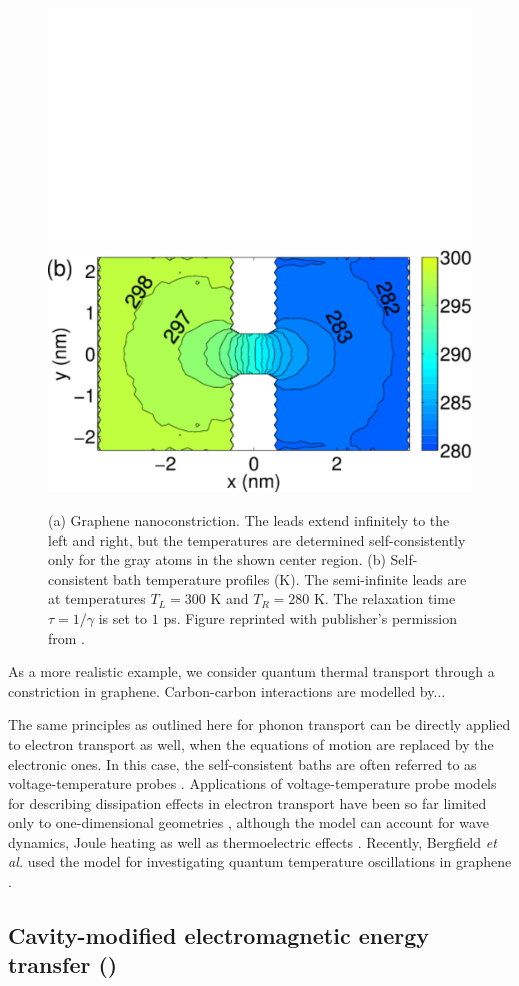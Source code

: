 \begin{figure}
 \begin{center}
 \includegraphics[width=.49\columnwidth]{pics/gf_fig8a.pdf}
 \includegraphics[width=.49\columnwidth]{pics/gf_fig8b.pdf}
 \end{center}
 \caption{(a) Graphene nanoconstriction. The leads extend infinitely to the left and right, but the temperatures are determined self-consistently only for the gray atoms in the shown center region. (b) Self-consistent bath temperature profiles (K). The semi-infinite leads are at temperatures $T_L=300$ K and $T_R=280$ K. The relaxation time $\tau=1/\gamma$ is set to $1$ ps. Figure reprinted with publisher's permission from .}
 \label{fig:gf_fig8}
\end{figure}

As a more realistic example, we consider quantum thermal transport through a constriction in graphene. Carbon-carbon interactions are modelled by...

The same principles as outlined here for phonon transport can be directly applied to electron transport as well, when the equations of motion are replaced by the electronic ones. In this case, the self-consistent baths are often referred to as voltage-temperature probes \cite{jacquet09}. Applications of voltage-temperature probe models for describing dissipation effects in electron transport have been so far limited only to one-dimensional geometries \cite{buttiker86,damato90,jacquet09,jacquet12}, although the model can account for wave dynamics, Joule heating as well as thermoelectric effects \cite{roy07}. Recently, Bergfield \textit{et al.} used the model for investigating quantum temperature oscillations in graphene \cite{bergfield15}.

\subsection{Cavity-modified electromagnetic energy transfer ()}
\label{sec:results_cavity}


